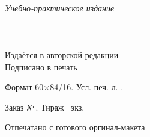 \newpage
\thispagestyle{empty}
~\vfill
\begin{centering}
  \textit{Учебно-практическое издание}\\[18pt]
  \AuthorI\\[6pt]
  {\large\Title}\\[6pt]
  \PubType\\[18pt]
  Издаётся в авторской редакции\\
  \vspace{18pt}
  Подписано в печать \PUBDATE

  Формат 60×84/16. Усл. печ. л. \SHEETS.
  
  Заказ №\,\PUBORDER. Тираж \PUBCOUNT\ экз.

  \vspace{6pt}

  Отпечатано с готового оргинал-макета

  \PUBLISHER

  \PUBADDR
  
  \LICENSE
  
\end{centering}
\vspace{1cm}
